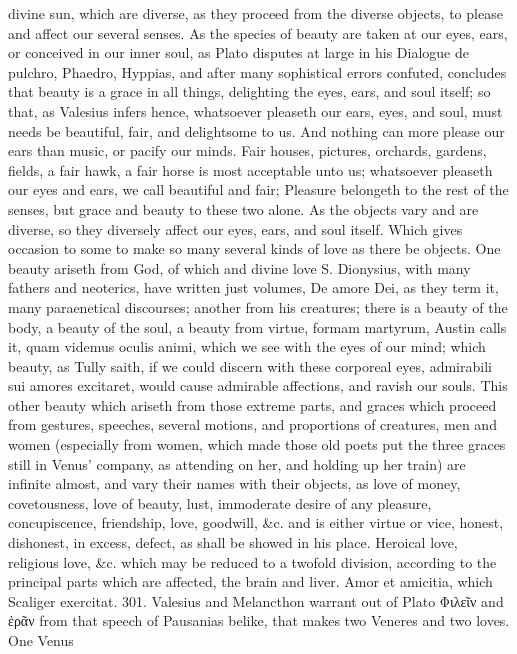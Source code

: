 {divine sun, which are diverse, as they proceed from the diverse
objects, to please and affect our several senses. As the species
of beauty are taken at our eyes, ears, or conceived in our inner soul,
as Plato disputes at large in his Dialogue de pulchro, Phaedro,
Hyppias, and after many sophistical errors confuted, concludes that
beauty is a grace in all things, delighting the eyes, ears, and soul
itself; so that, as Valesius infers hence, whatsoever pleaseth our
ears, eyes, and soul, must needs be beautiful, fair, and delightsome to
us. And nothing can more please our ears than music, or pacify
our minds. Fair houses, pictures, orchards, gardens, fields, a fair
hawk, a fair horse is most acceptable unto us; whatsoever pleaseth our
eyes and ears, we call beautiful and fair; Pleasure belongeth to
the rest of the senses, but grace and beauty to these two alone. As the
objects vary and are diverse, so they diversely affect our eyes, ears,
and soul itself. Which gives occasion to some to make so many several
kinds of love as there be objects. One beauty ariseth from God, of
which and divine love S. Dionysius, with many fathers and
neoterics, have written just volumes, De amore Dei, as they term it,
many paraenetical discourses; another from his creatures; there is a
beauty of the body, a beauty of the soul, a beauty from virtue, formam
martyrum, Austin calls it, quam videmus oculis animi, which we see with
the eyes of our mind; which beauty, as Tully saith, if we could discern
with these corporeal eyes, admirabili sui amores excitaret, would cause
admirable affections, and ravish our souls. This other beauty which
ariseth from those extreme parts, and graces which proceed from
gestures, speeches, several motions, and proportions of creatures, men
and women (especially from women, which made those old poets put the
three graces still in Venus' company, as attending on her, and holding
up her train) are infinite almost, and vary their names with their
objects, as love of money, covetousness, love of beauty, lust,
immoderate desire of any pleasure, concupiscence, friendship, love,
goodwill, \&c. and is either virtue or vice, honest, dishonest, in
excess, defect, as shall be showed in his place. Heroical love,
religious love, \&c. which may be reduced to a twofold division,
according to the principal parts which are affected, the brain and
liver. Amor et amicitia, which Scaliger exercitat. 301. Valesius and
Melancthon warrant out of Plato Φιλεῖν and ἐρᾶν from that speech of
Pausanias belike, that makes two Veneres and two loves. One Venus
}
